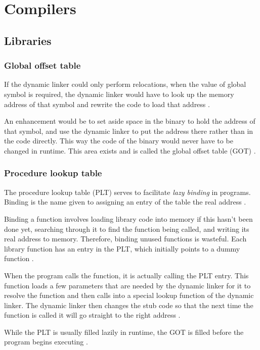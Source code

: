 \chapter{Compilers}

\section{Libraries}

\subsection{Global offset table}

If the dynamic linker could only perform relocations, when the value of global symbol is required, the dynamic linker would have to look up the memory address of that symbol and rewrite the code to load that address \cite{computer-science-from-the-bottom-up}.

An enhancement would be to set aside space in the binary to hold the address of that symbol, and use the dynamic linker to put the address there rather than in the code directly.
This way the code of the binary would never have to be changed in runtime.
This area exists and is called the global offset table (GOT) \cite{computer-science-from-the-bottom-up}.

\subsection{Procedure lookup table}

The procedure lookup table (PLT) serves to facilitate \textit{lazy binding} in programs.
Binding is the name given to assigning an entry of the table the real address \cite{computer-science-from-the-bottom-up}.

Binding a function involves loading library code into memory if this hasn't been done yet, searching through it to find the function being called, and writing its real address to memory.
Therefore, binding unused functions is wasteful.
Each library function has an entry in the PLT, which initially points to a dummy function \cite{computer-science-from-the-bottom-up}.

When the program calls the function, it is actually calling the PLT entry.
This function loads a few parameters that are needed by the dynamic linker for it to resolve the function and then calls into a special lookup function of the dynamic linker.
The dynamic linker then changes the stub code so that the next time the function is called it will go straight to the right address \cite{computer-science-from-the-bottom-up}.

While the PLT is usually filled lazily in runtime, the GOT is filled before the program begins executing \cite{computer-science-from-the-bottom-up}.
